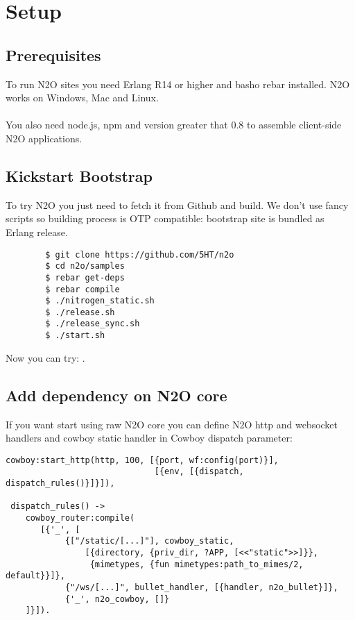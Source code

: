 \section{Setup}

\subsection{Prerequisites}
To run N2O sites you need Erlang R14 or higher and basho rebar installed.
N2O works on Windows, Mac and Linux.

\paragraph{}
You also need node.js, npm and  version greater that 0.8 to assemble client-side N2O applications.

\subsection{Kickstart Bootstrap}
To try N2O you just need to fetch it from Github and build. We don't use
fancy scripts so building process is OTP compatible: bootstrap site
is bundled as Erlang release.

\vspace{1\baselineskip}
\begin{lstlisting}
        $ git clone https://github.com/5HT/n2o
        $ cd n2o/samples
        $ rebar get-deps
        $ rebar compile
        $ ./nitrogen_static.sh
        $ ./release.sh
        $ ./release_sync.sh
        $ ./start.sh
\end{lstlisting}
\vspace{1\baselineskip}

Now you can try: .

\newpage
\subsection{Add dependency on N2O core}
If you want start using raw N2O core you can define N2O http and websocket handlers and cowboy static
handler in Cowboy dispatch parameter:

\begin{lstlisting}[caption=web\_sup.erl]
 cowboy:start_http(http, 100, [{port, wf:config(port)}],
                              [{env, [{dispatch, dispatch_rules()}]}]),

 dispatch_rules() ->
    cowboy_router:compile(
       [{'_', [
            {["/static/[...]"], cowboy_static,
                [{directory, {priv_dir, ?APP, [<<"static">>]}},
                 {mimetypes, {fun mimetypes:path_to_mimes/2, default}}]}, 
            {"/ws/[...]", bullet_handler, [{handler, n2o_bullet}]},
            {'_', n2o_cowboy, []}
    ]}]).
\end{lstlisting}

